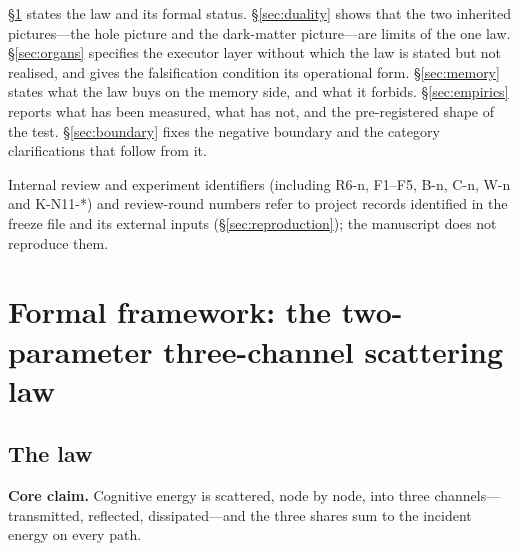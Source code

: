 \documentclass[11pt,a4paper]{article}
\begin{document}
\S\ref{sec:framework} states the law and its formal status. \S\ref{sec:duality} shows that the two inherited pictures---the hole picture and the dark-matter picture---are limits of the one law. \S\ref{sec:organs} specifies the executor layer without which the law is stated but not realised, and gives the falsification condition its operational form. \S\ref{sec:memory} states what the law buys on the memory side, and what it forbids. \S\ref{sec:empirics} reports what has been measured, what has not, and the pre-registered shape of the test. \S\ref{sec:boundary} fixes the negative boundary and the category clarifications that follow from it.

Internal review and experiment identifiers (including R6-n, F1--F5, B-n, C-n, W-n and K-N11-*) and review-round numbers refer to project records identified in the freeze file and its external inputs (\S\ref{sec:reproduction}); the manuscript does not reproduce them.

\section{Formal framework: the two-parameter three-channel scattering law}
\label{sec:framework}

\subsection{The law}
\label{sec:framework-law}

\textbf{Core claim.} Cognitive energy is scattered, node by node, into three channels---transmitted, reflected, dissipated---and the three shares sum to the incident energy on every path.
\end{document}
